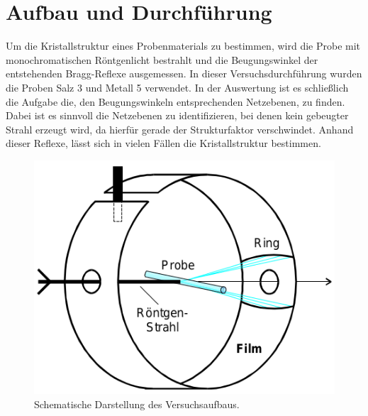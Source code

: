 

\section{Aufbau und Durchführung}

Um die Kristallstruktur eines Probenmaterials zu bestimmen, wird die Probe mit
monochromatischen Röntgenlicht bestrahlt und die Beugungswinkel der
entstehenden Bragg-Reflexe ausgemessen. In dieser Versuchsdurchführung wurden
die Proben Salz 3 und Metall 5 verwendet.
In der Auswertung ist es schließlich die Aufgabe die, den Beugungswinkeln
entsprechenden Netzebenen, zu finden. Dabei ist es sinnvoll die Netzebenen zu
identifizieren, bei denen kein gebeugter Strahl erzeugt wird, da hierfür gerade
der Strukturfaktor verschwindet. Anhand dieser Reflexe, lässt sich in vielen
Fällen die Kristallstruktur bestimmen.

\begin{figure}[htpb]
  \centering
  \includegraphics[scale=0.5]{bilder/aufbau.png}
  \caption{Schematische Darstellung des Versuchsaufbaus.\cite{AP}}
\label{fig:aufbau}
\end{figure}

